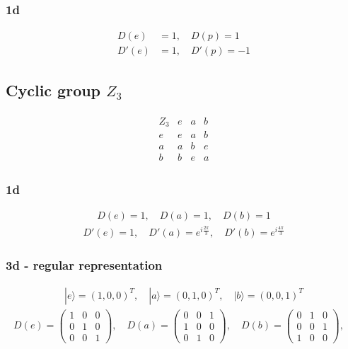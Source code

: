 \documentclass[10pt,a4paper]{article}
\theoremstyle{definition}
\begin{document}
\subsubsection{1d}
\begin{align}
D(e)&=1,\quad D(p)=1\\
D'(e)&=1,\quad D'(p)=-1
\end{align}

\subsection{Cyclic group \texorpdfstring{$Z_3$}{TEXT}}
\begin{align}
\begin{array}{c||ccc}
Z_3 & e & a & b \\ \hline\hline
e & e & a & b \\
a & a & b & e \\
b & b & e & a
\end{array}
\end{align}
\subsubsection{1d}
\begin{align}
D(e)=1,\quad D(a)=1,\quad D(b)=1
\end{align}
\begin{align}
D'(e)=1,\quad D'(a)=e^{i\frac{2\pi}{3}},\quad D'(b)=e^{i\frac{4\pi}{3}}
\end{align}


\subsubsection{3d - regular representation}
\begin{align}
|e\rangle=(1,0,0)^T,\quad |a\rangle=(0,1,0)^T,\quad |b\rangle=(0,0,1)^T
\end{align}
\begin{align}
D(e)=\left(\begin{array}{ccc}
1 & 0 & 0 \\
0 & 1 & 0 \\
0 & 0 & 1 
\end{array}
\right),\quad
D(a)=\left(\begin{array}{ccc}
0 & 0 & 1 \\
1 & 0 & 0 \\
0 & 1 & 0 
\end{array}
\right),\quad
D(b)=\left(\begin{array}{ccc}
0 & 1 & 0 \\
0 & 0 & 1 \\
1 & 0 & 0 
\end{array}
\right),\quad
\end{align}
\end{document}
